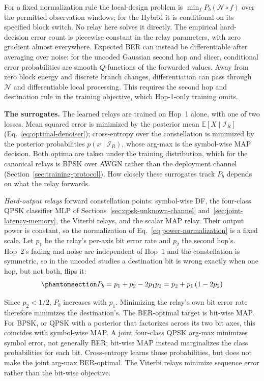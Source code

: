 For a fixed normalization rule the local-design problem is $\min_f P_b(\mathcal N\circ f)$ over the permitted observation windows; for the Hybrid it is conditional on its specified block switch. No relay here solves it directly. The empirical hard-decision error count is piecewise constant in the relay parameters, with zero gradient almost everywhere. Expected BER can instead be differentiable after averaging over noise: for the uncoded Gaussian second hop and slicer, conditional error probabilities are smooth $Q$-functions of the forwarded values. Away from zero block energy and discrete branch changes, differentiation can pass through $\mathcal N$ and differentiable local processing. This requires the second hop and destination rule in the training objective, which Hop-1-only training omits.

\textbf{The surrogates.} The learned relays are trained on Hop~1 alone, with one of two losses. Mean squared error is minimized by the posterior mean $\mathbb{E}[X \mid \mathcal{I}_R]$ (Eq.~\eqref{eq:optimal-denoiser}); cross-entropy over the constellation is minimized by the posterior probabilities $p(x \mid \mathcal{I}_R)$, whose arg-max is the symbol-wise MAP decision. Both optima are taken under the training distribution, which for the canonical relays is BPSK over AWGN rather than the deployment channel (Section~\ref{sec:training-protocol}). How closely these surrogates track $P_b$ depends on what the relay forwards.

\emph{Hard-output relays} forward constellation points: symbol-wise DF, the four-class QPSK classifier MLP of Sections~\ref{sec:qpsk-unknown-channel} and~\ref{sec:joint-latency-memory}, the Viterbi relays, and the scalar MAP relay. Their output power is constant, so the normalization of Eq.~\eqref{eq:power-normalization} is a fixed scale. Let $p_1$ be the relay's per-axis bit error rate and $p_2$ the second hop's. Hop~2's fading and noise are independent of Hop~1 and the constellation is symmetric, so in the uncoded studies a destination bit is wrong exactly when one hop, but not both, flips it:
\begin{equation}\protect\phantomsection\label{eq:hard-relay-composition}{P_b = p_1 + p_2 - 2p_1p_2 = p_2 + p_1\,(1 - 2p_2)
}\end{equation}
Since $p_2 < 1/2$, $P_b$ increases with $p_1$. Minimizing the relay's own bit error rate therefore minimizes the destination's. The BER-optimal target is bit-wise MAP. For BPSK, or QPSK with a posterior that factorizes across its two bit axes, this coincides with symbol-wise MAP. A joint four-class QPSK arg-max minimizes symbol error, not generally BER; bit-wise MAP instead marginalizes the class probabilities for each bit. Cross-entropy learns those probabilities, but does not make the joint arg-max BER-optimal. The Viterbi relays minimize sequence error rather than the bit-wise objective.

